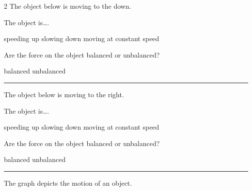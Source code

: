 \documentclass[answers]{exam}
\begin{document}
\begin{questions}
\begin{multicols*}{2}
\question
The object below is moving to the down.

\begin{center}
\end{center}

The object is\dots .

\begin{randomizechoices}[norandomize]
    \correctchoice speeding up
    \choice slowing down
    \choice moving at constant speed 
\end{randomizechoices}

\question 
Are the force on the object balanced or unbalanced?

\begin{randomizechoices}[norandomize]
    \choice balanced
    \correctchoice unbalanced
\end{randomizechoices}

\bigskip
\hrule

\question 
The object below is moving to the right.

\begin{center}
\end{center}

The object is\dots .

\begin{randomizechoices}[norandomize]
    \correctchoice speeding up
    \choice slowing down
    \choice moving at constant speed 
\end{randomizechoices}

\question 
Are the force on the object balanced or unbalanced?

\begin{randomizechoices}[norandomize]
    \choice balanced
    \correctchoice unbalanced
\end{randomizechoices}

\bigskip
\hrule

\vspace*{\fill}
\end{multicols*}

\question
The graph depicts the motion of an object.


\end{questions}
\end{document}
